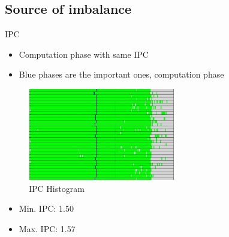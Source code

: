 \documentclass[aspectratio=169]{bredelebeamer}
\begin{document}
\subsection{Source of imbalance}
\begin{frame}{IPC}

\begin{itemize}
\item Computation phase with same IPC
\item Blue phases are the important ones, computation phase
\end{itemize}

\begin{figure}[h!]
  \centering
  \includegraphics[width=\textwidth,height=4cm,keepaspectratio]{"./img/one_step/IPC_histograma_4x4x2"}
  \caption*{IPC Histogram}
\end{figure}

\begin{itemize}
\item Min. IPC: 1.50
\item Max. IPC: 1.57
\end{itemize}

\end{frame}
\end{document}
